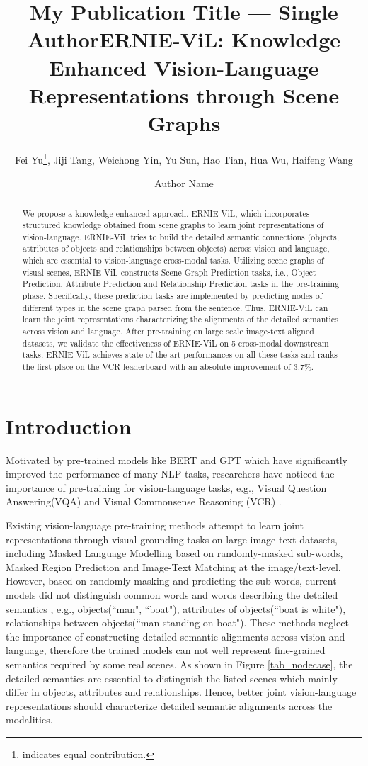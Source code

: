 \documentclass[letterpaper]{article} \usepackage{aaai21}  \usepackage{times}  \usepackage{helvet} \usepackage{courier}  \usepackage[hyphens]{url}  \usepackage{graphicx} \urlstyle{rm} \def\UrlFont{\rm}  \usepackage{natbib}  \usepackage{caption} \frenchspacing  \setlength{\pdfpagewidth}{8.5in}  \setlength{\pdfpageheight}{11in}  \usepackage{cite}
\author{

    Fei Yu{\rm}\thanks{indicates equal contribution.},
    Jiji Tang\footnotemark[1],
    Weichong Yin,
    Yu Sun,
    Hao Tian,
    Hua Wu,
    Haifeng Wang
    
}
\title{My Publication Title --- Single Author}
\author {
Author Name \\
}
\title{ERNIE-ViL: Knowledge Enhanced Vision-Language \\
Representations through Scene Graphs}
\begin{document}
\maketitle


\begin{abstract}
We propose a knowledge-enhanced approach, ERNIE-ViL, which incorporates structured knowledge obtained from scene graphs to learn joint representations of vision-language. ERNIE-ViL tries to build the detailed semantic connections (objects, attributes of objects and relationships between objects) across vision and language, which are essential to vision-language cross-modal tasks. Utilizing scene graphs of visual scenes, ERNIE-ViL constructs Scene Graph Prediction tasks, i.e., Object Prediction, Attribute Prediction and Relationship Prediction tasks in the pre-training phase. Specifically, these prediction tasks are implemented by predicting nodes of different types in the scene graph parsed from the sentence. Thus, ERNIE-ViL can learn the joint representations characterizing the alignments of the detailed semantics across vision and language. After pre-training on large scale image-text aligned datasets, we validate the effectiveness of ERNIE-ViL on 5 cross-modal downstream tasks. ERNIE-ViL achieves state-of-the-art performances on all these tasks and ranks the first place on the VCR leaderboard with an absolute improvement of 3.7\%.

\end{abstract}

\section{Introduction}
Motivated by pre-trained models like BERT \cite{devlin2018bert} and GPT \cite{radford2018improving} which have significantly improved the performance of many NLP tasks, researchers \cite{lu2019vilbert,li2019unicoder,su2019vl,li2019visualbert,chen2019uniter} have noticed the importance of pre-training for vision-language tasks, e.g., Visual Question Answering(VQA) \cite{antol2015vqa} and 
Visual Commonsense Reasoning (VCR) \cite{zellers2019recognition}.

Existing vision-language pre-training methods attempt to learn joint representations through visual grounding tasks on large image-text datasets, including Masked Language Modelling based on randomly-masked sub-words, Masked Region Prediction and Image-Text Matching at the image/text-level. However, based on randomly-masking and predicting the sub-words, current models did not distinguish common words and words describing the detailed semantics \cite{johnson2015image},  e.g., objects(``man", ``boat"), attributes of objects(``boat is white"), relationships between objects(``man standing on boat"). These methods neglect the importance of constructing detailed semantic alignments across vision and language, therefore the trained models can not well represent fine-grained semantics required by some real scenes. As shown in Figure \ref{tab_nodecase}, the detailed semantics are essential to distinguish the listed scenes which mainly differ in objects, attributes and relationships. Hence, better joint vision-language representations should characterize detailed semantic alignments across the modalities.
\end{document}
